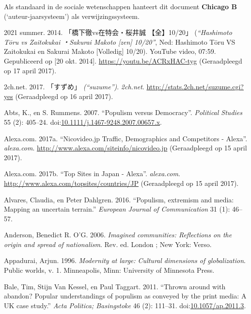 \documentclass[10.5pt,dutch,]{article}
\begin{document}
Als standaard in de sociale wetenschappen hanteert dit document
\textbf{Chicago B} (`auteur-jaarsysteem') als verwijzingssysteem.

\vspace{4mm}

\setlength{\parskip}{0em} \footnotesize

\hypertarget{refs}{}
\hypertarget{ref-2021ux5fsummerux5fhashimotoux5f2014}{}
2021 summer. 2014. 「橋下徹vs在特会・桜井誠 【全】10/20」 (\emph{“Hashimoto Tōru vs Zaitokukai ・Sakurai Makoto [zen] 10/20”}, Ned: Hashimoto Tōru VS Zaitokukai  en Sakurai Makoto [Volledig] 10/20). YouTube video, 07:59. Gepubliceerd op [20 okt. 2014]. \url{https://youtu.be/ACRxHAC-tyg} (Geraadpleegd op 17 april 2017).

\hypertarget{ref-2ch.netux5fsuzumeux5f2017}{}
2ch.net. 2017. 「すずめ」 \emph{(“suzume”)}. \emph{2ch.net}. \url{http://stats.2ch.net/suzume.cgi?yes} (Geraadpleegd op 16 april 2017).

\hypertarget{ref-abtsux5fpopulismux5f2007}{}
Abts, K., en S. Rummens. 2007. “Populism versus Democracy”. 
\emph{Political Studies} 55 (2): 405--24.
doi:\href{https://doi.org/10.1111/j.1467-9248.2007.00657.x}{10.1111/j.1467-9248.2007.00657.x}.

\hypertarget{ref-alexa.comux5fnicovideo.jpux5f2017}{}
Alexa.com. 2017a. “Nicovideo.jp Traffic, Demographics and Competitors - Alexa”. \emph{alexa.com}. \url{http://www.alexa.com/siteinfo/nicovideo.jp} (Geraadpleegd op 15 april 2017).

\hypertarget{ref-alexa.comux5ftopux5f2017}{}
Alexa.com. 2017b. “Top Sites in Japan - Alexa”.  \emph{alexa.com}. \url{http://www.alexa.com/topsites/countries/JP} (Geraadpleegd op 15 april 2017).

\hypertarget{ref-alvaresux5fpopulismux5f2016}{}
Alvares, Claudia, en Peter Dahlgren. 2016. “Populism, extremism and
media: Mapping an uncertain terrain.”  \emph{European Journal of
Communication} 31 (1): 46--57.

\hypertarget{ref-andersonux5fimaginedux5f2006}{}
Anderson, Benedict R. O'G. 2006. \emph{Imagined communities: Reflections
on the origin and spread of nationalism}. Rev. ed. London ; New York:
Verso.

\hypertarget{ref-appaduraiux5fmodernityux5f1996}{}
Appadurai, Arjun. 1996. \emph{Modernity at large: Cultural dimensions of
globalization}. Public worlds, v. 1. Minneapolis, Minn: University of
Minnesota Press.

\hypertarget{ref-baleux5fthrownux5f2011}{}
Bale, Tim, Stijn Van Kessel, en Paul Taggart. 2011. “Thrown around with
abandon? Popular understandings of populism as conveyed by the print
media: A UK case study.”  \emph{Acta Politica; Basingstoke} 46 (2):
111--31.
doi:\href{https://doi.org/10.1057/ap.2011.3}{10.1057/ap.2011.3}.
\end{document}
